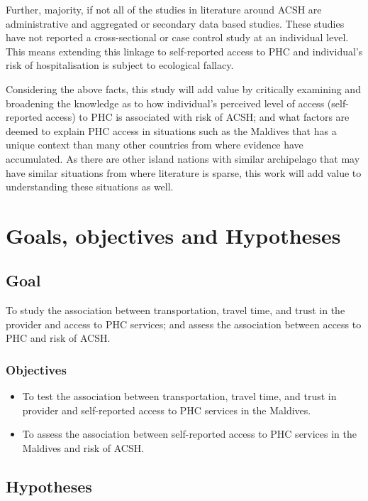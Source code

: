 Further, majority, if not all of the studies in literature around ACSH are administrative and aggregated or secondary data based studies. These studies have not reported a cross-sectional or case control study at an individual level. This means extending this linkage to self-reported access to PHC and individual's risk of hospitalisation is subject to ecological fallacy.

Considering the above facts, this study will add value by critically examining and broadening the knowledge as to how individual's perceived level of access (self-reported access) to PHC is associated with risk of ACSH; and what factors are deemed to explain PHC access in situations such as the Maldives that has a unique context than many other countries from where evidence have accumulated. As there are other island nations with similar archipelago that may have similar situations from where literature is sparse, this work will add value to understanding these situations as well.
 
\section{Goals, objectives and Hypotheses}

\subsection{Goal} 

To study the association between transportation, travel time, and trust in the provider and access to PHC services; and assess the association between access to PHC and risk of ACSH.

\subsubsection{Objectives}

\begin{itemize}
  \item To test the association between transportation, travel time, and trust in provider and self-reported access to PHC services in the Maldives. 
  \item To assess the association between self-reported access to PHC services in the Maldives and risk of ACSH.
\end{itemize}

\subsection{Hypotheses}

